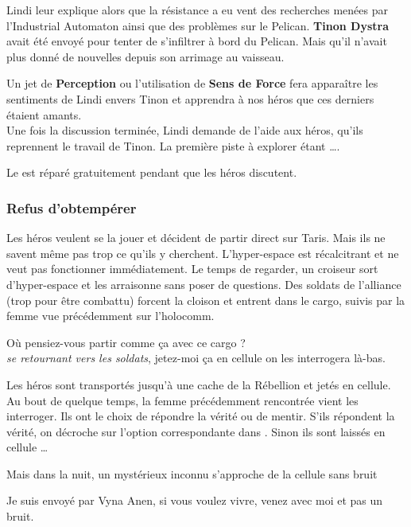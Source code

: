 Lindi leur explique alors que la résistance a eu vent des recherches menées par l’Industrial Automaton ainsi que des problèmes sur le Pelican. \textbf{Tinon Dystra} avait été envoyé pour tenter de s’infiltrer à bord du Pelican. Mais qu’il n’avait plus donné de nouvelles depuis son arrimage au vaisseau.

Un jet de \textbf{Perception} ou l’utilisation de \textbf{Sens de Force} fera apparaître les sentiments de Lindi envers Tinon et apprendra à nos héros que ces derniers étaient amants.\\

Une fois la discussion terminée, Lindi demande de l’aide aux héros, qu’ils reprennent le travail de Tinon. La première piste à explorer étant \ldots {}.

Le  est réparé gratuitement pendant que les héros discutent.


\subsubsection{Refus d’obtempérer} \label{sec:refus-d-obtemperer}

Les héros veulent se la jouer et décident de partir direct sur Taris. Mais ils ne savent même pas trop ce qu’ils y cherchent. L’hyper-espace est récalcitrant et ne veut pas fonctionner immédiatement. Le temps de regarder, un croiseur sort d’hyper-espace et les arraisonne sans poser de questions. Des soldats de l’alliance (trop pour être combattu) forcent la cloison et entrent dans le cargo, suivis par la femme vue précédemment sur l’holocomm.

\begin{quotebox}
    Où pensiez-vous partir comme ça avec ce cargo ? \\
    \emph{se retournant vers les soldats}, jetez-moi ça en cellule on les interrogera là-bas.
\end{quotebox}

Les héros sont transportés jusqu’à une cache de la Rébellion et jetés en cellule. Au bout de quelque temps, la femme précédemment rencontrée vient les interroger. Ils ont le choix de répondre la vérité ou de mentir. S’ils répondent la vérité, on décroche sur l’option correspondante dans . Sinon ils sont laissés en cellule \ldots

Mais dans la nuit, un mystérieux inconnu s’approche de la cellule sans bruit

\begin{quotebox}
    Je suis envoyé par Vyna Anen, si vous voulez vivre, venez avec moi et pas un bruit.
\end{quotebox}

